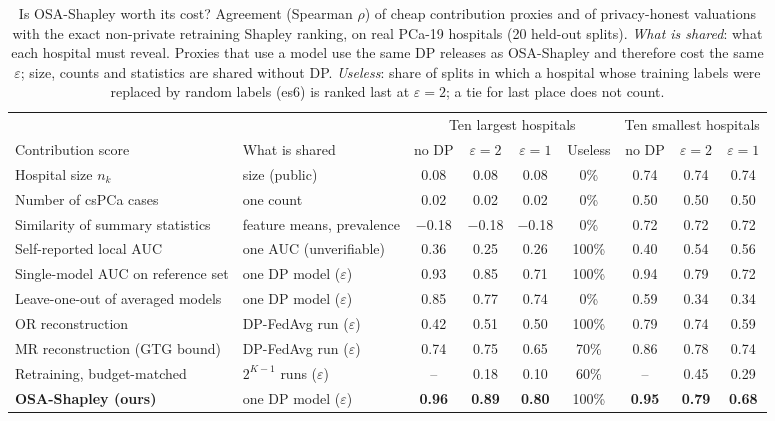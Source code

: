 \begin{table}[t]
\caption{Is OSA-Shapley worth its cost? Agreement (Spearman $\rho$) of cheap contribution proxies and of privacy-honest valuations with the exact non-private retraining Shapley ranking, on real PCa-19 hospitals (20 held-out splits). \emph{What is shared}: what each hospital must reveal. Proxies that use a model use the same DP releases as OSA-Shapley and therefore cost the same $\varepsilon$; size, counts and statistics are shared without DP. \emph{Useless}: share of splits in which a hospital whose training labels were replaced by random labels (es6) is ranked last at $\varepsilon=2$; a tie for last place does not count.}
\centering\scriptsize
\setlength{\tabcolsep}{4pt}
\begin{tabular}{llccccccc}
\toprule
 & & \multicolumn{4}{c}{Ten largest hospitals} & \multicolumn{3}{c}{Ten smallest hospitals} \\
\cmidrule(lr){3-6}\cmidrule(lr){7-9}
Contribution score & What is shared & no DP & $\varepsilon=2$ & $\varepsilon=1$ & Useless & no DP & $\varepsilon=2$ & $\varepsilon=1$ \\
\midrule
Hospital size $n_k$ & size (public) & 0.08 & 0.08 & 0.08 & 0\% & 0.74 & 0.74 & 0.74 \\
Number of csPCa cases & one count & 0.02 & 0.02 & 0.02 & 0\% & 0.50 & 0.50 & 0.50 \\
Similarity of summary statistics & feature means, prevalence & \ensuremath{-}0.18 & \ensuremath{-}0.18 & \ensuremath{-}0.18 & 0\% & 0.72 & 0.72 & 0.72 \\
Self-reported local AUC & one AUC (unverifiable) & 0.36 & 0.25 & 0.26 & 100\% & 0.40 & 0.54 & 0.56 \\
Single-model AUC on reference set & one DP model ($\varepsilon$) & 0.93 & 0.85 & 0.71 & 100\% & 0.94 & 0.79 & 0.72 \\
Leave-one-out of averaged models & one DP model ($\varepsilon$) & 0.85 & 0.77 & 0.74 & 0\% & 0.59 & 0.34 & 0.34 \\
OR reconstruction & DP-FedAvg run ($\varepsilon$) & 0.42 & 0.51 & 0.50 & 100\% & 0.79 & 0.74 & 0.59 \\
MR reconstruction (GTG bound) & DP-FedAvg run ($\varepsilon$) & 0.74 & 0.75 & 0.65 & 70\% & 0.86 & 0.78 & 0.74 \\
Retraining, budget-matched & $2^{K-1}$ runs ($\varepsilon$) & -- & 0.18 & 0.10 & 60\% & -- & 0.45 & 0.29 \\
\textbf{OSA-Shapley (ours)} & one DP model ($\varepsilon$) & \textbf{0.96} & \textbf{0.89} & \textbf{0.80} & 100\% & \textbf{0.95} & \textbf{0.79} & \textbf{0.68} \\
\bottomrule
\end{tabular}
\label{tab:proxies}
\end{table}
